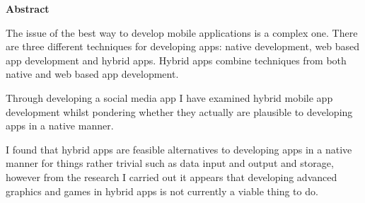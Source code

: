 \thispagestyle{empty}

\begin{center}
    {\LARGE\bf Abstract}
\end{center}

The issue of the best way to develop mobile applications is a complex one. There are three different techniques for developing apps: native development, web based app development and hybrid apps. Hybrid apps combine techniques from both native and web based app development.

Through developing a social media app I have examined hybrid mobile app development whilst pondering whether they actually are plausible to developing apps in a native manner.

I found that hybrid apps are feasible alternatives to developing apps in a native manner for things rather trivial such as data input and output and storage, however from the research I carried out it appears that developing advanced graphics and games in hybrid apps is not currently a viable thing to do.

